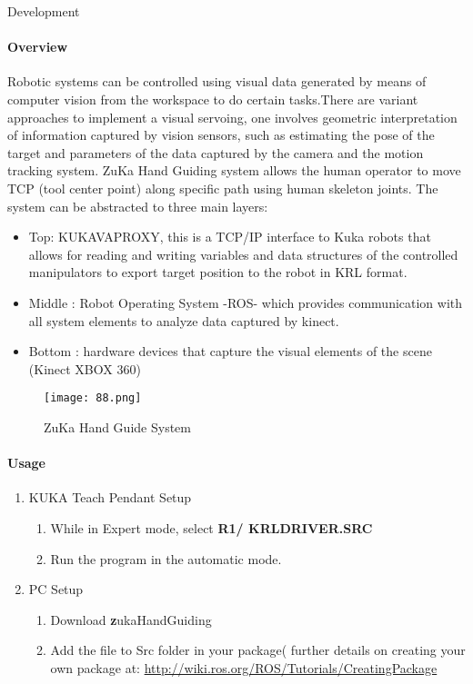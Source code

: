 \documentclass[a4paper]{book}
\begin{document}
\begin{chapter}{Development}
\paragraph {Overview}
Robotic systems can be controlled using visual data generated by means of computer vision from the workspace to do certain tasks.There are variant approaches to implement a visual servoing, one involves geometric interpretation of information captured by vision sensors, such as estimating the pose of the target and parameters of the data captured by the camera and the motion tracking system. 
\newline \vspace{.5cm}
ZuKa Hand Guiding system allows the human operator to move TCP (tool center point) along specific path using human skeleton joints. The system can be abstracted to three main layers:
\begin{itemize}
	\item Top: KUKAVAPROXY, this is a TCP/IP interface to Kuka robots that allows for reading and writing variables and data structures of the controlled manipulators to export target position to the robot in KRL format.
	
	\item  Middle : Robot Operating System -ROS- which provides communication with all system elements to analyze data captured by kinect.
	
	\item Bottom : hardware devices that capture the visual elements of the scene (Kinect XBOX 360)
\end{itemize}
\begin{figure}[H]
	\centering
	\caption{ZuKa Hand Guide System}
	\texttt{[image: 88.png]}
\end{figure} 

\paragraph{Usage}
\begin{enumerate}
	\item KUKA Teach Pendant Setup
	\begin{enumerate}
		\item While in Expert mode, select \textbf{R1/ KRLDRIVER.SRC}
		\item Run the program in the automatic mode.
	\end{enumerate}
\item PC Setup
\begin{enumerate}
		\item Download \textbf zukaHandGuiding
		\item Add the file to Src folder in your package( further details on creating your own package at:
		\newline	\url{http://wiki.ros.org/ROS/Tutorials/CreatingPackage}
		

\end{enumerate}
\end{enumerate}
\end{chapter}
\end{document}
